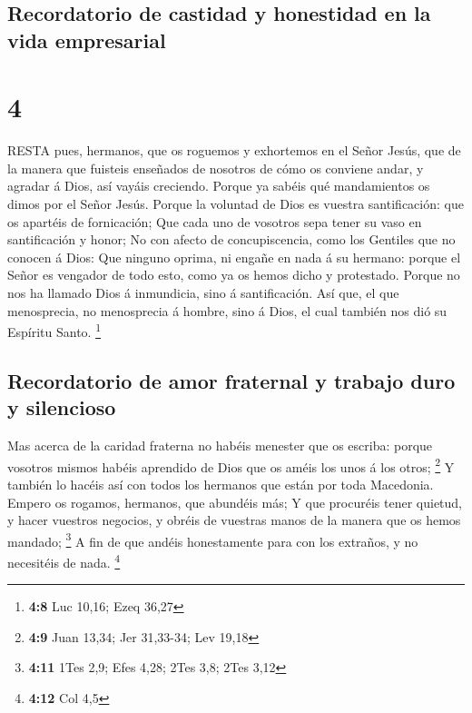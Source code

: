 \hypertarget{recordatorio-de-castidad-y-honestidad-en-la-vida-empresarial}{%
\subsection{Recordatorio de castidad y honestidad en la vida
empresarial}\label{recordatorio-de-castidad-y-honestidad-en-la-vida-empresarial}}

\hypertarget{section-3}{%
\section{4}\label{section-3}}

 RESTA pues, hermanos, que os roguemos y exhortemos en el
Señor Jesús, que de la manera que fuisteis enseñados de nosotros de cómo
os conviene andar, y agradar á Dios, así vayáis creciendo. 
Porque ya sabéis qué mandamientos os dimos por el Señor Jesús.
 Porque la voluntad de Dios es vuestra santificación: que os
apartéis de fornicación;  Que cada uno de vosotros sepa
tener su vaso en santificación y honor;  No con afecto de
concupiscencia, como los Gentiles que no conocen á Dios: 
Que ninguno oprima, ni engañe en nada á su hermano: porque el Señor es
vengador de todo esto, como ya os hemos dicho y protestado. 
Porque no nos ha llamado Dios á inmundicia, sino á santificación.
 Así que, el que menosprecia, no menosprecia á hombre, sino
á Dios, el cual también nos dió su Espíritu Santo. \footnote{\textbf{4:8}
  Luc 10,16; Ezeq 36,27}

\hypertarget{recordatorio-de-amor-fraternal-y-trabajo-duro-y-silencioso}{%
\subsection{Recordatorio de amor fraternal y trabajo duro y
silencioso}\label{recordatorio-de-amor-fraternal-y-trabajo-duro-y-silencioso}}

 Mas acerca de la caridad fraterna no habéis menester que os
escriba: porque vosotros mismos habéis aprendido de Dios que os améis
los unos á los otros; \footnote{\textbf{4:9} Juan 13,34; Jer 31,33-34;
  Lev 19,18}  Y también lo hacéis así con todos los
hermanos que están por toda Macedonia. Empero os rogamos, hermanos, que
abundéis más;  Y que procuréis tener quietud, y hacer
vuestros negocios, y obréis de vuestras manos de la manera que os hemos
mandado; \footnote{\textbf{4:11} 1Tes 2,9; Efes 4,28; 2Tes 3,8; 2Tes
  3,12}  A fin de que andéis honestamente para con los
extraños, y no necesitéis de nada. \footnote{\textbf{4:12} Col 4,5}

